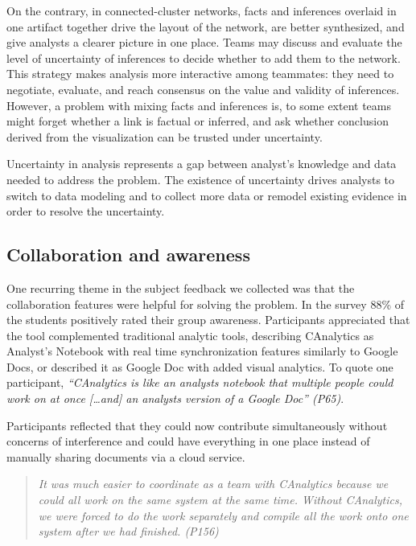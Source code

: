 

On the contrary, in connected-cluster networks, facts and inferences overlaid in one artifact together drive the layout of the
network, are better synthesized, and give analysts a clearer picture in one place. Teams may discuss and evaluate the level of uncertainty of inferences to decide whether to add them to the
network. This strategy makes analysis more interactive among teammates:
they need to negotiate, evaluate, and reach consensus on the value and
validity of inferences. However, a problem with mixing facts and inferences is, to some extent teams might forget whether a
link is factual or inferred, and ask whether conclusion derived
from the visualization can be trusted under uncertainty.

Uncertainty in analysis represents a gap between analyst's knowledge and data needed to address the problem. The existence of uncertainty drives analysts to switch to data modeling and to collect more data or remodel existing evidence in order to resolve the uncertainty.

\subsection{Collaboration and
awareness}\label{collaboration-and-awareness}

One recurring theme in the subject feedback we collected was that the
collaboration features were helpful for solving the problem. In the survey
88\% of the students positively rated their
group awareness. Participants appreciated that the tool complemented
traditional analytic tools, describing CAnalytics as Analyst's Notebook with real time
synchronization features similarly to Google Docs, or described it as Google Doc with added visual analytics. To quote one participant,
\emph{``CAnalytics is like an analysts notebook that multiple people
could work on at once {[}\ldots{}and{]} an analysts version of a Google
Doc'' (P65)}.

Participants reflected that they could now contribute simultaneously
without concerns of interference and could
have everything in one place instead of manually sharing documents via a
cloud service.

\begin{quote}
\emph{It was much easier to coordinate as a team with CAnalytics because we
could all work on the same system at the same time. Without CAnalytics,
we were forced to do the work separately and compile all the work onto
one system after we had finished. (P156)}
\end{quote}

